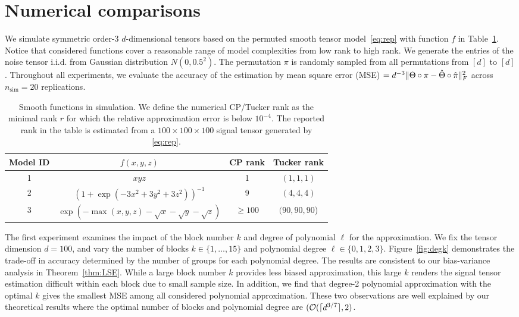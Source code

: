 \documentclass{article}
\theoremstyle{definition}
\begin{document}
\vspace{-.2cm}
\section{Numerical comparisons}\label{sec:sim}
\vspace{-.2cm}
We simulate symmetric order-3 $d$-dimensional tensors based on the permuted smooth tensor model~\eqref{eq:rep} with function $f$ in Table~\ref{tb:md}. Notice that considered functions cover a reasonable range of model complexities from low rank to high rank. We generate the entries of the noise tensor i.i.d. from Gaussian distribution $N(0,0.5^2)$. The permutation $\pi$ is randomly sampled from all permutations from $[d]$ to $[d]$. 
Throughout all experiments, we evaluate the accuracy of the estimation by mean square error (MSE) $= d^{-3}\lVert\Theta\circ\pi-\hat\Theta\circ\hat\pi\rVert_F^2$ across $n_{\text{sim}} = 20$ replications.

 \begin{table}[htp]
     \vspace{-.2cm}
    \centering
    \caption{Smooth functions in simulation. We define the numerical CP/Tucker rank as the minimal rank $r$ for which the relative approximation error is below $10^{-4}$. The reported rank in the table is estimated from a $100\times100\times100$  signal tensor generated by \eqref{eq:rep}.\\ }
    \begin{tabular}{c|c|c|c}
        Model ID  &  $f(x,y,z)$ & CP rank & Tucker rank \\\hline
        1 &    $xyz$ & 1 & $(1,1,1)$\\
        2 & $(1+\exp(-3x^2+3y^2+3z^2))^{-1}$ &9& $(4,4,4)$ \\
        3 &  $\exp\left(-\max(x,y,z)-\sqrt{x}-\sqrt{y}-\sqrt{z}\right)$ &$\geq 100$& $(90,90,90$)
    \end{tabular}
    \vspace{-.2cm}
    \label{tb:md}
\end{table}

The first experiment examines the impact of the block number $k$ and degree of polynomial $\ell$ for the approximation. We fix the tensor dimension $d = 100$, and vary the number of blocks $k\in\{1,\ldots,15\}$ and polynomial degree $\ell\in\{0,1,2,3\}.$
Figure~\ref{fig:degk} demonstrates the trade-off in accuracy determined by the number of groups for each polynomial degree. The results are consistent to our bias-variance analysis in Theorem~\ref{thm:LSE}. While a large block number $k$ provides less biased approximation, this large $k$ renders the signal tensor estimation difficult within each block due to small sample size. In addition, we find that degree-2 polynomial approximation with the optimal $k$ gives the smallest MSE among all considered polynomial approximation. These two observations are well explained by our theoretical results where the optimal number of blocks and polynomial degree are $(\mathcal{O}(\lceil d^{3/7}\rceil,2)$. 
 
\end{document}
